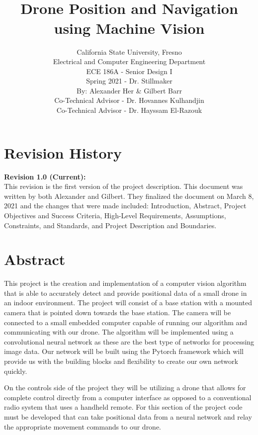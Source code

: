 \documentclass[12pt,onecolumn]{IEEEtran}			%
\title{ \hfill  \vspace{2in} \\ Drone Position and Navigation using Machine Vision  \vspace{1in} }	%
\author{California State University, Fresno \\
Electrical and Computer Engineering Department \\
ECE 186A - Senior Design I \\ 					%
Spring 2021 - Dr. Stillmaker \\ 					%

\vspace{12pt} 								%
By: Alexander Her 
\&
Gilbert Barr \\
Co-Technical Advisor - Dr. Hovannes Kulhandjin \\
Co-Technical Advisor - Dr. Hayssam El-Razouk
\vspace{2in}								%


\vspace{4in}}								%
\begin{document}
\maketitle									%
\thispagestyle{empty}						%
\newpage

\newpage


 

 \section*{Revision History}

 \textbf{Revision 1.0 (Current):} \\
 This revision is the first version of the project description. This document was written by both Alexander and Gilbert. They finalized the document on March 8, 2021 and the changes that were made included: Introduction, Abstract, Project Objectives and Success Criteria, High-Level Requirements, Assumptions, Constraints, and Standards, and Project Description and Boundaries. 

\newpage 
\tableofcontents %



 
 \newpage 
 \section*{Abstract}
 This project is the creation and implementation of a computer vision algorithm that is able to accurately detect and provide positional data of a small drone in an indoor environment. The project will consist of a base station with a mounted camera that is pointed down towards the base station. The camera will be connected to a small embedded computer capable of running our algorithm and communicating with our drone. The algorithm will be implemented using a convolutional neural network as these are the best type of networks for processing image data. Our network will be built using the Pytorch framework which will provide us with the building blocks and flexibility to create our own network quickly.
 
 On the controls side of the project they will be utilizing a drone that allows for complete control directly from a computer interface as opposed to a conventional radio system that uses a handheld remote. For this section of the project code must be developed that can take positional data from a neural network and relay the appropriate movement commands to our drone.
 
\end{document}
